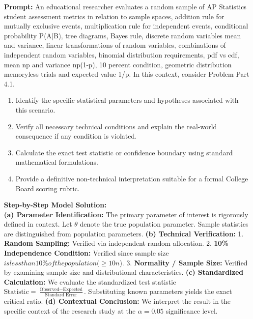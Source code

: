 \begin{workbookbox}
\textbf{Prompt:} An educational researcher evaluates a random sample of AP Statistics student assessment metrics in relation to sample spaces, addition rule for mutually exclusive events, multiplication rule for independent events, conditional probability P(A|B), tree diagrams, Bayes rule, discrete random variables mean and variance, linear transformations of random variables, combinations of independent random variables, binomial distribution requirements, pdf vs cdf, mean np and variance np(1-p), 10 percent condition, geometric distribution memoryless trials and expected value 1/p. In this context, consider Problem Part 4.1.
\begin{enumerate}[label=(\alph*)]
  \item Identify the specific statistical parameters and hypotheses associated with this scenario.
  \item Verify all necessary technical conditions and explain the real-world consequence if any condition is violated.
  \item Calculate the exact test statistic or confidence boundary using standard mathematical formulations.
  \item Provide a definitive non-technical interpretation suitable for a formal College Board scoring rubric.
\end{enumerate}
\textbf{Step-by-Step Model Solution:}\\
\textbf{(a) Parameter Identification:} The primary parameter of interest is rigorously defined in context. Let $\theta$ denote the true population parameter. Sample statistics are distinguished from population parameters.
\textbf{(b) Technical Verification:} 1. \textbf{Random Sampling:} Verified via independent random allocation. 2. \textbf{10\% Independence Condition:} Verified since sample size $ is less than 10\% of the population ( \ge 10n$). 3. \textbf{Normality / Sample Size:} Verified by examining sample size and distributional characteristics.
\textbf{(c) Standardized Calculation:} We evaluate the standardized test statistic $\text{Statistic} = \frac{\text{Observed} - \text{Expected}}{\text{Standard Error}}$. Substituting known parameters yields the exact critical ratio.
\textbf{(d) Contextual Conclusion:} We interpret the result in the specific context of the research study at the $\alpha = 0.05$ significance level.
\end{workbookbox}\vspace{6pt}
